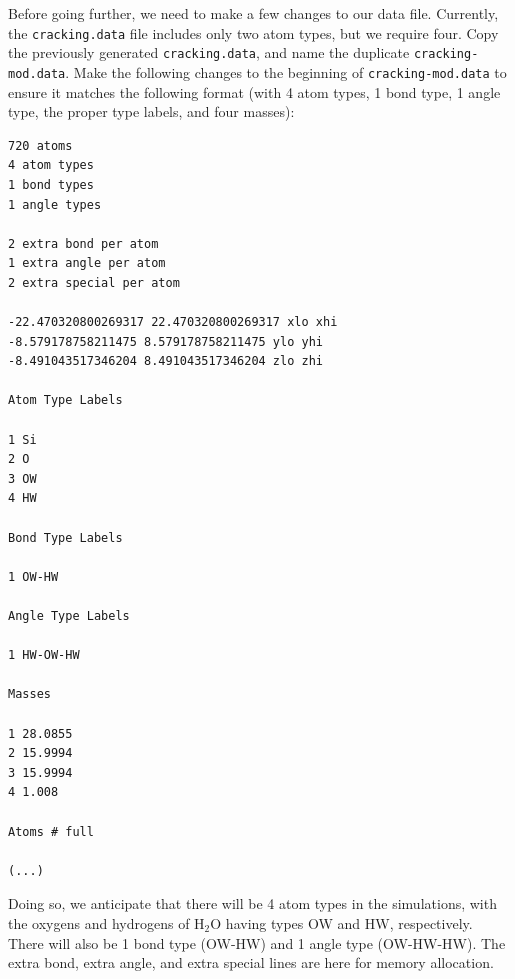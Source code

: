 \documentclass[9pt,tutorial]{livecoms}
\newcommand{\lmpcmd}[1]{\colorbox{listing}{\textcolor{command}{\small{#1}}}} %
\newcommand{\flecmd}[1]{\textcolor{command}{\texttt{#1}}} %
\begin{document}
Before going further, we need to make a few changes to our data file.
Currently, the \flecmd{cracking.data} file includes only two atom types, but we require four.
Copy the previously generated \flecmd{cracking.data}, and name the duplicate \flecmd{cracking-mod.data}.
Make the following changes to the beginning of \flecmd{cracking-mod.data}
to ensure it matches the following format (with 4 atom types,
1 bond type, 1 angle type, the proper type labels, and four masses):
\begin{lstlisting}
720 atoms
4 atom types
1 bond types
1 angle types

2 extra bond per atom
1 extra angle per atom
2 extra special per atom

-22.470320800269317 22.470320800269317 xlo xhi
-8.579178758211475 8.579178758211475 ylo yhi
-8.491043517346204 8.491043517346204 zlo zhi

Atom Type Labels

1 Si
2 O
3 OW
4 HW

Bond Type Labels

1 OW-HW

Angle Type Labels

1 HW-OW-HW

Masses

1 28.0855
2 15.9994
3 15.9994
4 1.008

Atoms # full

(...)
\end{lstlisting}
Doing so, we anticipate that there will be 4 atom types in the simulations,
with the oxygens and hydrogens of $\text{H}_2\text{O}$ having
types \lmpcmd{OW} and \lmpcmd{HW}, respectively.  There
will also be 1 bond type (\lmpcmd{OW-HW}) and 1 angle type (\lmpcmd{OW-HW-HW}).
The \lmpcmd{extra bond}, \lmpcmd{extra angle}, and
\lmpcmd{extra special} lines are here for memory allocation.
\end{document}
